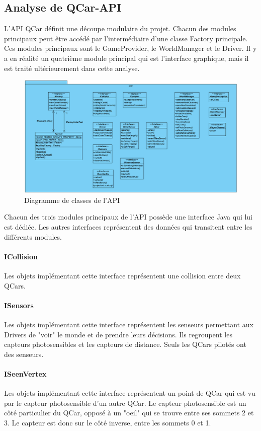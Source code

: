 \documentclass[a4paper, 12pt]{article}
\begin{document}
\subsection{Analyse de QCar-API} 
L'API QCar définit une découpe modulaire du projet. Chacun des modules principaux peut être accédé par l'intermédiaire d'une classe Factory principale. Ces modules principaux sont le GameProvider, le WorldManager et le Driver. Il y a en réalité un quatrième module principal qui est l'interface graphique, mais il est traité ultérieurement dans cette analyse.
\begin{figure}[H]
 \centering
 \includegraphics[width=1.0\textwidth]{includes/images/diag_classes_api}
 \caption{\label{fig:diag_classes_api}Diagramme de classes de l'API}
\end{figure}
Chacun des trois modules principaux de l'API possède une interface Java qui lui est dédiée. Les autres interfaces représentent des données qui transitent entre les différents modules.
\paragraph{ICollision}
Les objets implémentant cette interface représentent une collision entre deux QCars.
\paragraph{ISensors}
Les objets implémentant cette interface représentent les senseurs permettant aux Drivers de "voir" le monde et de prendre leurs décisions. Ils regroupent les capteurs photosensibles et les capteurs de distance. Seuls les QCars pilotés ont des senseurs.
\paragraph{ISeenVertex}
Les objets implémentant cette interface représentent un point de QCar qui est vu par le capteur photosensible d'un autre QCar. Le capteur photosensible est un côté particulier du QCar, opposé à un "oeil" qui se trouve entre ses sommets 2 et 3. Le capteur est donc sur le côté inverse, entre les sommets 0 et 1.
\end{document}

